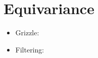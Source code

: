 
\chapter{Equivariance}


\begin{itemize}
  \item Grizzle: \cite{grizzle_structure_1985}
  \item Filtering: \cite{van_goor_equivariant_2020}
\end{itemize}
